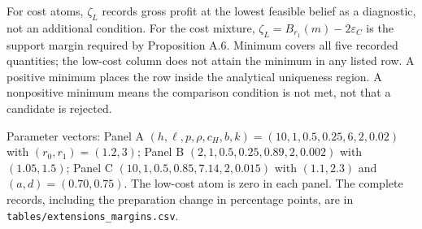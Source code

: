 \begin{landscape}
\begin{table}[tbp]
\begin{threeparttable}
\begin{tablenotes}
\item For cost atoms, $\zeta_L$ records gross profit at the lowest feasible belief as a diagnostic, not an additional condition. For the cost mixture, $\zeta_L=B_{r_1}(m)-2\varepsilon_C$ is the support margin required by Proposition A.6. Minimum covers all five recorded quantities; the low-cost column does not attain the minimum in any listed row. A positive minimum places the row inside the analytical uniqueness region. A nonpositive minimum means the comparison condition is not met, not that a candidate is rejected.
\item Parameter vectors: Panel A $(h,\ell,p,\rho,c_H,b,k)=(10,1,0.5,0.25,6,2,0.02)$ with $(r_0,r_1)=(1.2,3)$; Panel B $(2,1,0.5,0.25,0.89,2,0.002)$ with $(1.05,1.5)$; Panel C $(10,1,0.5,0.85,7.14,2,0.015)$ with $(1.1,2.3)$ and $(a,d)=(0.70,0.75)$. The low-cost atom is zero in each panel. The complete records, including the preparation change in percentage points, are in \texttt{tables/extensions\_margins.csv}.
\end{tablenotes}
\end{threeparttable}
\par\endgroup\end{table}
\end{landscape}
